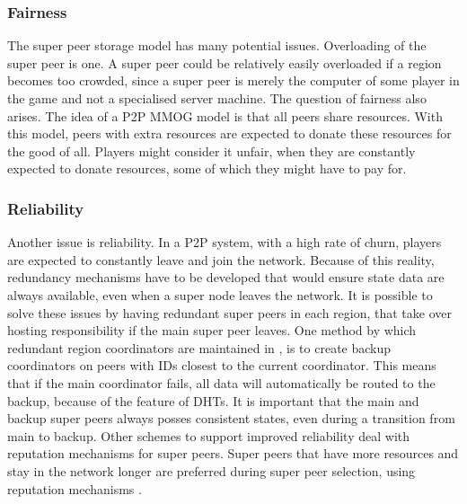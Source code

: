 \documentclass[journal,oneside,a4paper,onecolumn]{IEEEtran}
\begin{document}
\subsubsection{Fairness}
The super peer storage model has many potential issues. Overloading of the super peer is one. A super peer could be relatively easily overloaded if a region becomes too crowded, since a super peer is merely the computer of some player in the game and not a specialised server machine. The question of fairness also arises. The idea of a P2P MMOG model is that all peers share resources. With this model, peers with extra resources are expected to donate these resources for the good of all. Players might consider it unfair, when they are constantly expected to donate resources, some of which they might have to pay for.

\subsubsection{Reliability}
Another issue is reliability. In a P2P system, with a high rate of churn, players are expected to constantly leave and join the network. Because of this reality, redundancy mechanisms have to be developed that would ensure state data are always available, even when a super node leaves the network. It is possible to solve these issues by having redundant super peers in each region, that take over hosting responsibility if the main super peer leaves. One method by which redundant region coordinators are maintained in \cite{knutsson_p2p_first}, is to create backup coordinators on peers with IDs closest to the current coordinator. This means that if the main coordinator fails, all data will automatically be routed to the backup, because of the feature of DHTs. It is important that the main and backup super peers always posses consistent states, even during a transition from main to backup. Other schemes to support improved reliability deal with reputation mechanisms for super peers. Super peers that have more resources and stay in the network longer are preferred during super peer selection, using reputation mechanisms \cite{fan_mediator_paper}.
\end{document}
